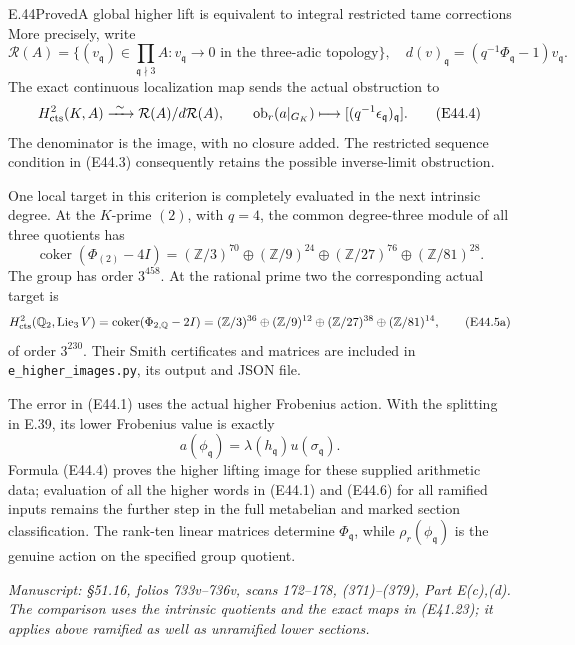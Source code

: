 \begin{statement}{E.44}{Proved}{A global higher lift is equivalent to integral restricted tame corrections}
More precisely, write
\[
 \mathcal R(A)=\{(v_{\mathfrak q})\in\prod_{\mathfrak q\nmid3}A:
                  v_{\mathfrak q}\longrightarrow0
                         \text{ in the three-adic topology}\},
 \quad
 d(v)_{\mathfrak q}=(q^{-1}\Phi_{\mathfrak q}-1)v_{\mathfrak q}.
\]
The exact continuous localization map sends the
actual obstruction to
\[
 H^2_{\rm cts}(K,A)
      \xrightarrow{\ \sim\ }\mathcal R(A)/d\mathcal R(A),
 \qquad
 \operatorname{ob}_r(a|_{G_K})
      \longmapsto[(q^{-1}\epsilon_{\mathfrak q})_{\mathfrak q}].
 \tag{E44.4}
\]
The denominator is the image, with no closure
added. The restricted sequence condition in
(E44.3) consequently retains the possible
inverse-limit obstruction.

One local target in this criterion is completely
evaluated in the next intrinsic degree. At the
$K$-prime $(2)$, with $q=4$, the common degree-three
module of all three quotients has
\[
 \operatorname{coker}(\Phi_{(2)}-4I)
    =(\mathbb Z/3)^{70}\oplus(\mathbb Z/9)^{24}
      \oplus(\mathbb Z/27)^{76}\oplus(\mathbb Z/81)^{28}.
 \tag{E44.5}
\]
The group has order $3^{458}$. At the rational
prime two the corresponding actual target is
\[
 H^2_{\rm cts}(\mathbb Q_2,\operatorname{Lie}_3V)
   =\operatorname{coker}(\Phi_{2,\mathbb Q}-2I)
   =(\mathbb Z/3)^{36}\oplus(\mathbb Z/9)^{12}
     \oplus(\mathbb Z/27)^{38}\oplus(\mathbb Z/81)^{14},
 \tag{E44.5a}
\]
of order $3^{230}$. Their Smith certificates
and matrices are included in
\texttt{e\_higher\_images.py}, its output and JSON file.

The error in (E44.1) uses the actual higher
Frobenius action. With the splitting in E.39,
its lower Frobenius value is exactly
\[
 a(\phi_{\mathfrak q})
      =\lambda(h_{\mathfrak q})u(\sigma_{\mathfrak q}).
 \tag{E44.6}
\]
Formula (E44.4) proves the higher lifting image
for these supplied arithmetic data; evaluation
of all the higher words in (E44.1) and (E44.6)
for all ramified inputs remains the further
step in the full metabelian and marked section
classification. The rank-ten linear matrices
determine $\Phi_{\mathfrak q}$, while
$\rho_r(\phi_{\mathfrak q})$ is the genuine
action on the specified group quotient.

\emph{Manuscript: \S51.16, folios 733v--736v,
scans 172--178, (371)--(379), Part E(c),(d).
The comparison uses the intrinsic quotients
and the exact maps in (E41.23); it applies
above ramified as well as unramified lower
sections.}
\end{statement}
